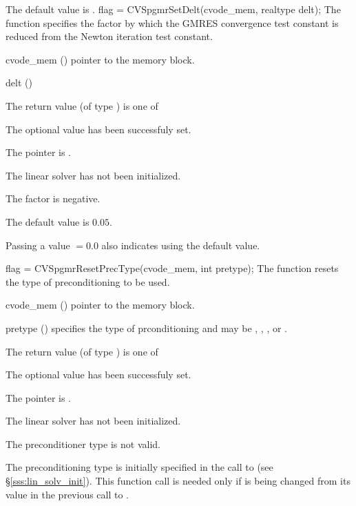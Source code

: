 {
  The default value is .
}
{
  flag = CVSpgmrSetDelt(cvode\_mem, realtype delt);
}
{
  The function  specifies the factor by
  which the GMRES convergence test constant is reduced
  from the Newton iteration test constant.
}
{
  \begin{args}
  \item[cvode\_mem] ()
    pointer to the {\cvode} memory block.
  \item[delt] ()

  \end{args}
}
{
  The return value  (of type ) is one of
  \begin{args}
  \item[\Id{SUCCESS}] 
    The optional value has been successfuly set.
  \item[\Id{LIN\_NO\_MEM}]
    The  pointer is .
  \item[\Id{LIN\_NO\_LMEM}]
    The {\cvspgmr} linear solver has not been initialized.
  \item[\Id{LIN\_ILL\_INPUT}]
    The factor  is negative.  
  \end{args}
}
{
  The default value is $0.05$.

  Passing a value $ = 0.0$ also indicates using the default value.
}
{
  flag = CVSpgmrResetPrecType(cvode\_mem, int pretype);
}
{
  The function  resets the type
  of preconditioning to be used.
}
{
  \begin{args}
  \item[cvode\_mem] ()
    pointer to the {\cvode} memory block.
  \item[pretype] ()
    specifies the type of prconditioning and may be
    , , , or .
  \end{args}
}
{
  The return value  (of type ) is one of
  \begin{args}
  \item[\Id{SUCCESS}] 
    The optional value has been successfuly set.
  \item[\Id{LIN\_NO\_MEM}]
    The  pointer is .
  \item[\Id{LIN\_NO\_LMEM}]
    The {\cvspgmr} linear solver has not been initialized.
  \item[\Id{LIN\_ILL\_INPUT}]
    The preconditioner type  is not valid.
  \end{args}
}
{
  The preconditioning type is initially specified in the call
  to  (see \S\ref{sss:lin_solv_init}). This function call is
  needed only if  is being changed from its value in the
  previous call to .
}

